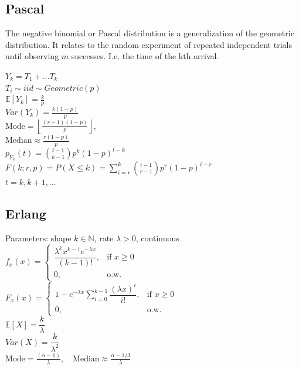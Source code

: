 \subsection*{Pascal}

The negative binomial or Pascal distribution is a generalization of the geometric distribution. It relates to the random experiment of repeated independent trials until observing $m$ successes. I.e. the time of the kth arrival.

$Y_k=T_1+...T_k$\\

$T_i \sim iid \sim Geometric(p)$\\

$\mathbb{E}[Y_k]=\frac{k}{p}$\\

$Var(Y_k)= \frac{k(1-p)}{p}$\\
$\text{Mode} = \left\lfloor \frac{(r-1)(1-p)}{p} \right\rfloor,\quad$\\
$\text{Median} \approx \frac{r(1-p)}{p}$\\


$p_{Y_k}(t) ={t-1 \choose k-1}p^k(1-p)^{t-k}$\\
$F(k; r, p) = P(X \leq k) = \sum_{i=r}^{k} \binom{i-1}{r-1} p^{r} (1 - p)^{i - r}$\\


$t=k,k+1,...$

\subsection*{Erlang}

Parameters: shape $k \in \mathbb{N}$, rate $\lambda > 0$, continuous\\
$ 
f_x(x)=
	\begin{cases}
		 \dfrac{\lambda^k x^{k-1} e^{-\lambda x}}{(k-1)!}, & \text{if } x \ge 0\\
		0, & \text{o.w.}
	\end{cases}
$\\

$ 
F_x(x)=
	\begin{cases}
		 1 - e^{-\lambda x}\sum_{i=0}^{k-1}\dfrac{(\lambda x)^i}{i!}, & \text{if } x \ge 0\\
		0, & \text{o.w.}
	\end{cases}
$\\

$\mathbb{E}[X]=\dfrac{k}{\lambda}$\\
$Var(X)=\dfrac{k}{\lambda^2}$\\
$\text{Mode} = \frac{(\alpha-1)}{\lambda},\quad \text{Median} \approx \frac{\alpha - 1/3}{\lambda}$

